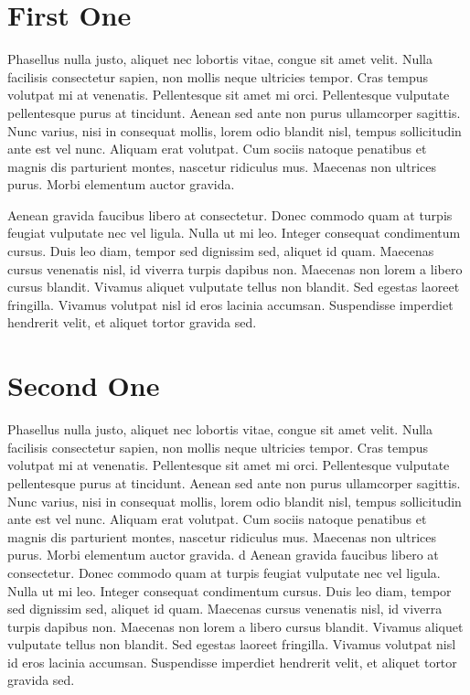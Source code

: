 \documentclass[12pt,oneside,final]{siuethesis}
\theoremstyle{definition}
\begin{document}

\multipleappendices

\chapter{First One}

Phasellus nulla justo, aliquet nec lobortis vitae, congue sit amet velit. Nulla facilisis consectetur sapien, non mollis neque ultricies tempor. Cras tempus volutpat mi at venenatis. Pellentesque sit amet mi orci. Pellentesque vulputate pellentesque purus at tincidunt. Aenean sed ante non purus ullamcorper sagittis. Nunc varius, nisi in consequat mollis, lorem odio blandit nisl, tempus sollicitudin ante est vel nunc. Aliquam erat volutpat. Cum sociis natoque penatibus et magnis dis parturient montes, nascetur ridiculus mus. Maecenas non ultrices purus. Morbi elementum auctor gravida.

Aenean gravida faucibus libero at consectetur. Donec commodo quam at turpis feugiat vulputate nec vel ligula. Nulla ut mi leo. Integer consequat condimentum cursus. Duis leo diam, tempor sed dignissim sed, aliquet id quam. Maecenas cursus venenatis nisl, id viverra turpis dapibus non. Maecenas non lorem a libero cursus blandit. Vivamus aliquet vulputate tellus non blandit. Sed egestas laoreet fringilla. Vivamus volutpat nisl id eros lacinia accumsan. Suspendisse imperdiet hendrerit velit, et aliquet tortor gravida sed.


\chapter{Second One}

Phasellus nulla justo, aliquet nec lobortis vitae, congue sit amet velit. Nulla facilisis consectetur sapien, non mollis neque ultricies tempor. Cras tempus volutpat mi at venenatis. Pellentesque sit amet mi orci. Pellentesque vulputate pellentesque purus at tincidunt. Aenean sed ante non purus ullamcorper sagittis. Nunc varius, nisi in consequat mollis, lorem odio blandit nisl, tempus sollicitudin ante est vel nunc. Aliquam erat volutpat. Cum sociis natoque penatibus et magnis dis parturient montes, nascetur ridiculus mus. Maecenas non ultrices purus. Morbi elementum auctor gravida.
d
Aenean gravida faucibus libero at consectetur. Donec commodo quam at turpis feugiat vulputate nec vel ligula. Nulla ut mi leo. Integer consequat condimentum cursus. Duis leo diam, tempor sed dignissim sed, aliquet id quam. Maecenas cursus venenatis nisl, id viverra turpis dapibus non. Maecenas non lorem a libero cursus blandit. Vivamus aliquet vulputate tellus non blandit. Sed egestas laoreet fringilla. Vivamus volutpat nisl id eros lacinia accumsan. Suspendisse imperdiet hendrerit velit, et aliquet tortor gravida sed. 
\end{document}
